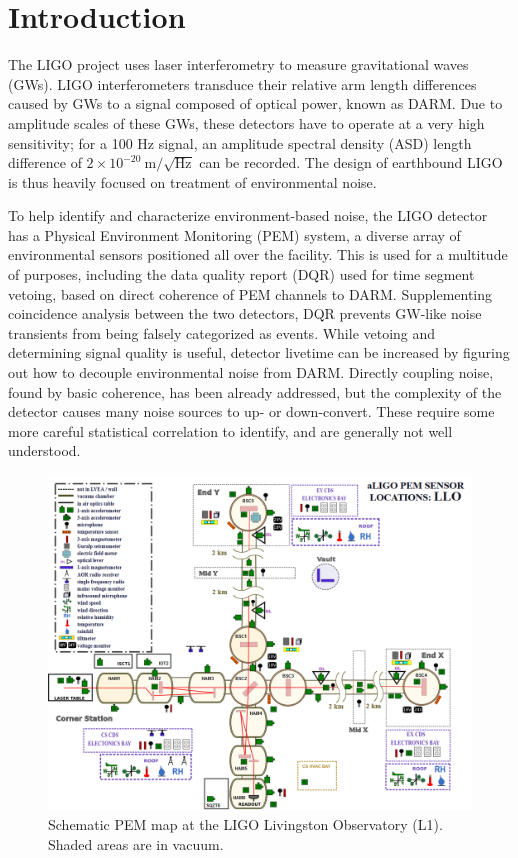 \section{Introduction}
The LIGO project uses laser interferometry to measure gravitational waves (GWs).
LIGO interferometers transduce their relative arm length differences caused by GWs to a signal composed of optical power, known as DARM.
Due to amplitude scales of these GWs, these detectors have to operate at a very high sensitivity; for a 100 Hz signal, an amplitude spectral density (ASD) length difference of $2\times 10^{-20}~\mathrm{m}/\sqrt{\mathrm{Hz}}$ can be recorded.
The design of earthbound LIGO is thus heavily focused on treatment of environmental noise.

To help identify and characterize environment-based noise, the LIGO detector has a Physical Environment Monitoring (PEM) system, a diverse array of environmental sensors positioned all over the facility.
This is used for a multitude of purposes, including the data quality report (DQR) used for time segment vetoing, based on direct coherence of PEM channels to DARM.
Supplementing coincidence analysis between the two detectors, DQR prevents GW-like noise transients from being falsely categorized as events.
While vetoing and determining signal quality is useful, detector livetime can be increased by figuring out how to decouple environmental noise from DARM.
Directly coupling noise, found by basic coherence, has been already addressed, but the complexity of the detector causes many noise sources to up- or down-convert.
These require some more careful statistical correlation to identify, and are generally not well understood.
\begin{figure}
\includegraphics[width=\textwidth]{assets/llopem.png}
\caption{Schematic PEM map at the LIGO Livingston Observatory (L1). Shaded areas are in vacuum.}
\end{figure}
